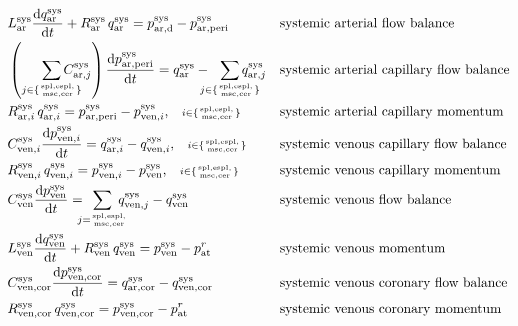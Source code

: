 \documentclass[a4paper,12pt]{report}
\begin{document}
\begin{equation}
\begin{aligned}
&L_{\mathrm{ar}}^{\mathrm{sys}}\frac{\mathrm{d}q_{\mathrm{ar}}^{\mathrm{sys}}}{\mathrm{d}t} + R_{\mathrm{ar}}^{\mathrm{sys}}\,q_{\mathrm{ar}}^{\mathrm{sys}}=p_{\mathrm{ar,d}}^{\mathrm{sys}} -p_{\mathrm{ar,peri}}^{\mathrm{sys}} && \text{systemic arterial flow balance}\\
&\left(\sum_{j\in\{\mathrm{spl,espl,\atop msc,cer}\}}\!\!\!\!\!\!\!\!\!C_{\mathrm{ar},j}^{\mathrm{sys}}\right) \frac{\mathrm{d}p_{\mathrm{ar,peri}}^{\mathrm{sys}}}{\mathrm{d}t} = q_{\mathrm{ar}}^{\mathrm{sys}}-\!\!\!\!\!\sum_{j\in\{\mathrm{spl,espl,\atop msc,cer}\}}\!\!\!\!\!\!\!\!\!q_{\mathrm{ar},j}^{\mathrm{sys}} && \text{systemic arterial capillary flow balance}\\
&R_{\mathrm{ar},i}^{\mathrm{sys}}\,q_{\mathrm{ar},i}^{\mathrm{sys}} = p_{\mathrm{ar,peri}}^{\mathrm{sys}} - p_{\mathrm{ven},i}^{\mathrm{sys}}, \quad\scriptstyle{i\in\{\mathrm{spl,espl,\atop msc,cer}\}} && \text{systemic arterial capillary momentum}\\
&C_{\mathrm{ven},i}^{\mathrm{sys}} \frac{\mathrm{d}p_{\mathrm{ven},i}^{\mathrm{sys}}}{\mathrm{d}t} = q_{\mathrm{ar},i}^{\mathrm{sys}} - q_{\mathrm{ven},i}^{\mathrm{sys}}, \quad\scriptstyle{i\in\{\mathrm{spl,espl,\atop msc,cer}\}} && \text{systemic venous capillary flow balance}\nonumber\\
&R_{\mathrm{ven},i}^{\mathrm{sys}}\,q_{\mathrm{ven},i}^{\mathrm{sys}} = p_{\mathrm{ven},i}^{\mathrm{sys}}-p_{\mathrm{ven}}^{\mathrm{sys}}, \quad\scriptstyle{i\in\{\mathrm{spl,espl,\atop msc,cer}\}} && \text{systemic venous capillary momentum}\nonumber\\
&C_{\mathrm{ven}}^{\mathrm{sys}} \frac{\mathrm{d}p_{\mathrm{ven}}^{\mathrm{sys}}}{\mathrm{d}t} = \!\!\!\!\sum_{j=\mathrm{spl,espl,\atop msc,cer}}\!\!\!\!\!q_{\mathrm{ven},j}^{\mathrm{sys}}-q_{\mathrm{ven}}^{\mathrm{sys}} && \text{systemic venous flow balance}\\
&L_{\mathrm{ven}}^{\mathrm{sys}}\frac{\mathrm{d}q_{\mathrm{ven}}^{\mathrm{sys}}}{\mathrm{d}t} + R_{\mathrm{ven}}^{\mathrm{sys}}\, q_{\mathrm{ven}}^{\mathrm{sys}} = p_{\mathrm{ven}}^{\mathrm{sys}} - p_{\mathrm{at}}^{r} && \text{systemic venous momentum}\nonumber\\
&C_{\mathrm{ven,cor}}^{\mathrm{sys}} \frac{\mathrm{d}p_{\mathrm{ven,cor}}^{\mathrm{sys}}}{\mathrm{d}t} = q_{\mathrm{ar,cor}}^{\mathrm{sys}}-q_{\mathrm{ven,cor}}^{\mathrm{sys}} && \text{systemic venous coronary flow balance}\nonumber\\
&R_{\mathrm{ven,cor}}^{\mathrm{sys}}\,q_{\mathrm{ven,cor}}^{\mathrm{sys}} = p_{\mathrm{ven,cor}}^{\mathrm{sys}} - p_{\mathrm{at}}^{r} && \text{systemic venous coronary momentum}
\end{aligned}
\end{equation}
\end{document}
